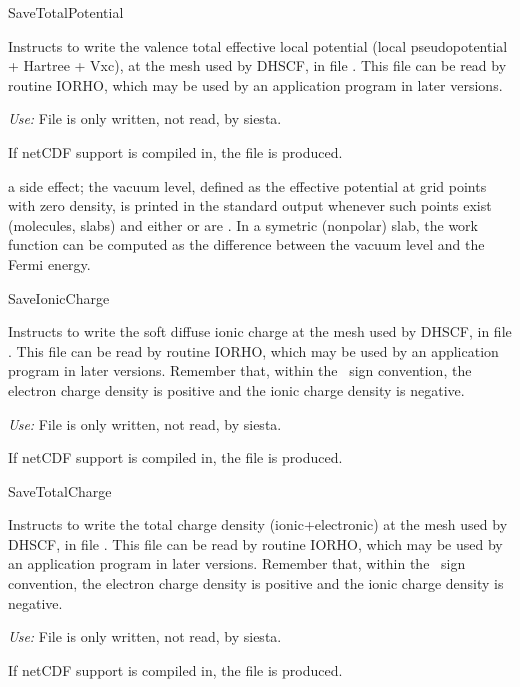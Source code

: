 \begin{fdflogicalF}{SaveTotalPotential}

  Instructs to write the valence total effective local potential
  (local pseudopotential + Hartree + Vxc), at the mesh used by DHSCF,
  in file . This file can be read by routine
  IORHO, which may be used by an application program in later
  versions.

  \textit{Use:} File  is only written, not read, by
  siesta.

  If netCDF support is compiled in, the file
   is produced.

  \note a side effect; the vacuum level, defined as the effective
  potential at grid points with zero density, is printed in the
  standard output whenever such points exist (molecules, slabs) and
  either  or 
  are \fdftrue.  In a symetric (nonpolar) slab, the work function can
  be computed as the difference between the vacuum level and the Fermi
  energy.

\end{fdflogicalF}

\begin{fdflogicalF}{SaveIonicCharge}

  Instructs to write the soft diffuse ionic charge at the mesh used by
  DHSCF, in file . This file can be read by routine
  IORHO, which may be used by an application program in later
  versions. Remember that, within the \siesta\ sign convention, the
  electron charge density is positive and the ionic charge density is
  negative.

  \textit{Use:} File  is only written, not read, by siesta.

  If netCDF support is compiled in, the file  is produced.

\end{fdflogicalF}

\begin{fdflogicalF}{SaveTotalCharge}

  Instructs to write the total charge density (ionic+electronic) at
  the mesh used by DHSCF, in file . This file
  can be read by routine IORHO, which may be used by an application
  program in later versions.  Remember that, within the \siesta\ sign
  convention, the electron charge density is positive and the ionic
  charge density is negative.

  \textit{Use:} File  is only written, not read, by
  siesta.

  If netCDF support is compiled in, the file
   is produced. 

\end{fdflogicalF}

